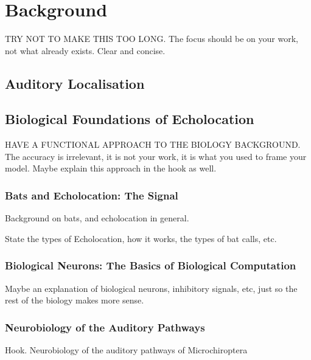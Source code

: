 \chapter{Background}


TRY NOT TO MAKE THIS TOO LONG. The focus should be on your work, not what already exists. Clear and concise.

\section{Auditory Localisation}


\section{Biological Foundations of Echolocation}

HAVE A FUNCTIONAL APPROACH TO THE BIOLOGY BACKGROUND. The accuracy is irrelevant, it is not your work, it is what you used to frame your model. Maybe explain this approach in the hook as well.

\subsection{Bats and Echolocation: The Signal}

Background on bats, and echolocation in general.

State the types of Echolocation, how it works, the types of bat calls, etc.

\subsection{Biological Neurons: The Basics of Biological Computation}

Maybe an explanation of biological neurons, inhibitory signals, etc, just so the rest of the biology makes more sense.

\subsection{Neurobiology of the Auditory Pathways}

Hook. Neurobiology of the auditory pathways of Microchiroptera

